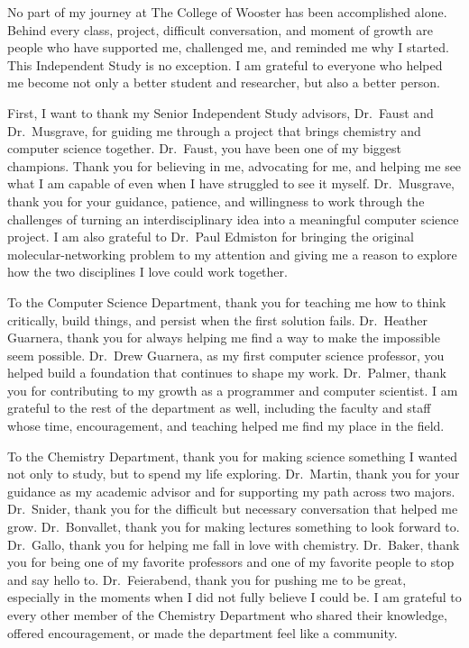 \documentclass[palatino,code,picins,tikz,kaukecopyright,openright,lshortwooster,dropcaps,verbatim,index,oneside,euler,final]{woosterthesis}
\begin{document}
\begin{acknowl}  
No part of my journey at The College of Wooster has been accomplished alone. Behind every class, project, difficult conversation, and moment of growth are people who have supported me, challenged me, and reminded me why I started. This Independent Study is no exception. I am grateful to everyone who helped me become not only a better student and researcher, but also a better person.

First, I want to thank my Senior Independent Study advisors, Dr.~Faust and Dr.~Musgrave, for guiding me through a project that brings chemistry and computer science together. Dr.~Faust, you have been one of my biggest champions. Thank you for believing in me, advocating for me, and helping me see what I am capable of even when I have struggled to see it myself. Dr.~Musgrave, thank you for your guidance, patience, and willingness to work through the challenges of turning an interdisciplinary idea into a meaningful computer science project. I am also grateful to Dr.~Paul Edmiston for bringing the original molecular-networking problem to my attention and giving me a reason to explore how the two disciplines I love could work together.

To the Computer Science Department, thank you for teaching me how to think critically, build things, and persist when the first solution fails. Dr.~Heather Guarnera, thank you for always helping me find a way to make the impossible seem possible. Dr.~Drew Guarnera, as my first computer science professor, you helped build a foundation that continues to shape my work. Dr.~Palmer, thank you for contributing to my growth as a programmer and computer scientist. I am grateful to the rest of the department as well, including the faculty and staff whose time, encouragement, and teaching helped me find my place in the field.

To the Chemistry Department, thank you for making science something I wanted not only to study, but to spend my life exploring. Dr.~Martin, thank you for your guidance as my academic advisor and for supporting my path across two majors. Dr.~Snider, thank you for the difficult but necessary conversation that helped me grow. Dr.~Bonvallet, thank you for making lectures something to look forward to. Dr.~Gallo, thank you for helping me fall in love with chemistry. Dr.~Baker, thank you for being one of my favorite professors and one of my favorite people to stop and say hello to. Dr.~Feierabend, thank you for pushing me to be great, especially in the moments when I did not fully believe I could be. I am grateful to every other member of the Chemistry Department who shared their knowledge, offered encouragement, or made the department feel like a community.


\end{acknowl}
\end{document}
